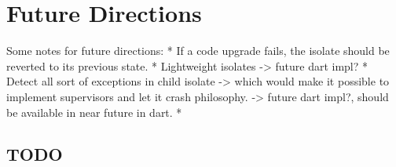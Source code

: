 \chapter{Future Directions}\label{chapter:future_directions}

Some notes for future directions:
 * If a code upgrade fails, the isolate should be reverted to its previous state.
 * Lightweight isolates -> future dart impl?
 * Detect all sort of exceptions in child isolate -> which would make it possible to implement supervisors and let it crash philosophy. -> future dart impl?, should be available in near future in dart.
 *
\section{TODO}
